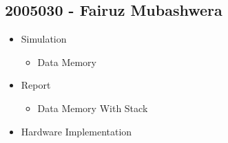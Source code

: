 \documentclass{article}
\begin{document}
\subsection*{2005030 - Fairuz Mubashwera}
\begin{itemize}
    \item Simulation
    \begin{itemize}
        \item Data Memory
    \end{itemize}
    \item Report
    \begin{itemize}
        \item Data Memory With Stack
    \end{itemize}
    \item Hardware Implementation
\end{itemize}
\end{document}
